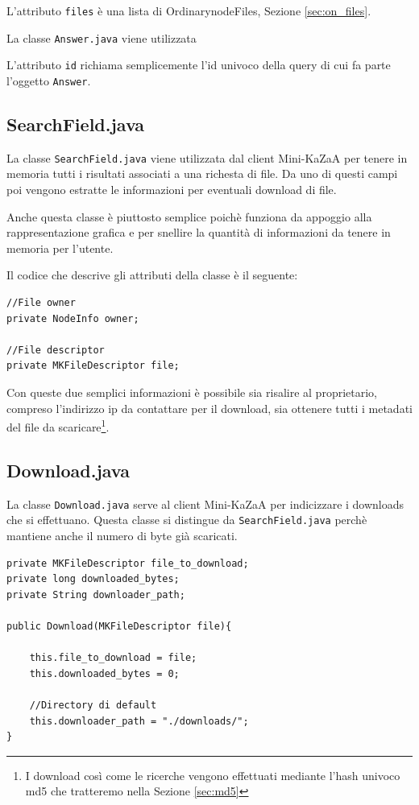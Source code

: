 L'attributo \verb|files| è una lista di OrdinarynodeFiles, Sezione \ref{sec:on_files}.

La classe \verb|Answer.java| viene utilizzata 

L'attributo \verb|id| richiama semplicemente l'id univoco della query di cui fa parte l'oggetto \verb|Answer|.

\subsection{SearchField.java}
La classe \verb|SearchField.java| viene utilizzata dal client Mini-KaZaA per tenere in memoria tutti i risultati
associati a una richesta di file.
Da uno di questi campi poi vengono estratte le informazioni per eventuali download di file.

Anche questa classe è piuttosto semplice poichè funziona da appoggio alla rappresentazione grafica e per snellire
la quantità di informazioni da tenere in memoria per l'utente.

Il codice che descrive gli attributi della classe è il seguente:
\newline
\begin{lstlisting}
//File owner
private NodeInfo owner;

//File descriptor
private MKFileDescriptor file;
\end{lstlisting}

Con queste due semplici informazioni è possibile sia risalire al proprietario, compreso l'indirizzo ip da contattare
per il download, sia ottenere tutti i metadati del file da scaricare\footnote{I download così come le ricerche vengono
effettuati mediante l'hash univoco md5 che tratteremo nella Sezione \ref{sec:md5}}.

\subsection{Download.java}
La classe \verb|Download.java| serve al client Mini-KaZaA per indicizzare i downloads che si effettuano. Questa classe si distingue da \verb|SearchField.java| perchè mantiene anche il numero di byte già scaricati.
\newline
\begin{lstlisting}
private MKFileDescriptor file_to_download;
private long downloaded_bytes;
private String downloader_path;

public Download(MKFileDescriptor file){

	this.file_to_download = file;
	this.downloaded_bytes = 0;

	//Directory di default
	this.downloader_path = "./downloads/";
}
\end{lstlisting}

